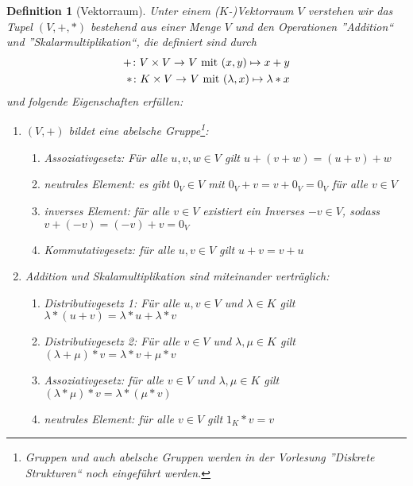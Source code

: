 \documentclass[ngerman, a4paper, 12pt]{scrreprt}
\newcounter{themcount}
\theoremstyle{plain}
\newtheorem{definition}[themcount]{Definition}
\theoremstyle{proofstyle}
\begin{document}
	\begin{definition}[Vektorraum]
		Unter einem ($K$-)Vektorraum $V$ verstehen wir das Tupel $(V,+,*)$ bestehend aus einer Menge $V$ und den Operationen ''Addition`` und ''Skalarmultiplikation``, die definiert sind durch
		\begin{equation*}
			\begin{aligned}
				\abb{+}{V \times V}{V} \mit (x,y) \mapsto x + y \\
				\abb{*}{K \times V}{V} \mit (\lambda , x) \mapsto \lambda * x
			\end{aligned}
		\end{equation*}
		und folgende Eigenschaften erfüllen:
		\begin{enumerate}[label=(V\arabic*), leftmargin=*]
			\item $(V,+)$ bildet eine abelsche Gruppe\footnote{Gruppen und auch abelsche Gruppen werden in der Vorlesung ''Diskrete Strukturen`` noch eingeführt werden.}:
			\begin{enumerate}[label=(\alph*), noitemsep]
				\item \textit{Assoziativgesetz}: Für alle $u,v,w \in V$ gilt $u + (v + w) = (u + v) + w$
				\item \textit{neutrales Element}: es gibt $0_V \in V$ mit $0_V + v = v + 0_V = 0_V$ für alle $v \in V$
				\item \textit{inverses Element}: für alle $v \in V$ existiert ein Inverses $-v \in V$, sodass $v + (-v) = (-v) + v = 0_V$
				\item \textit{Kommutativgesetz}: für alle $u,v \in V$ gilt $u + v = v + u$
			\end{enumerate}
		\item Addition und Skalamultiplikation sind miteinander verträglich: 
			\begin{enumerate}[label=(\alph*), noitemsep]
				\item \textit{Distributivgesetz 1}: Für alle $u,v \in V$ und $\lambda \in K$ gilt $\lambda * (u + v) = \lambda * u + \lambda * v$
				\item \textit{Distributivgesetz 2}: Für alle $v \in V$ und $\lambda, \mu \in K$ gilt $(\lambda + \mu) * v = \lambda * v + \mu * v$
				\item \textit{Assoziativgesetz}: für alle $v \in V$ und $\lambda, \mu \in K$ gilt $(\lambda * \mu) * v = \lambda * (\mu * v)$
				\item \textit{neutrales Element}: für alle $v \in V$ gilt $1_K * v = v$
			\end{enumerate}
		\end{enumerate}
	\end{definition}
\end{document}
